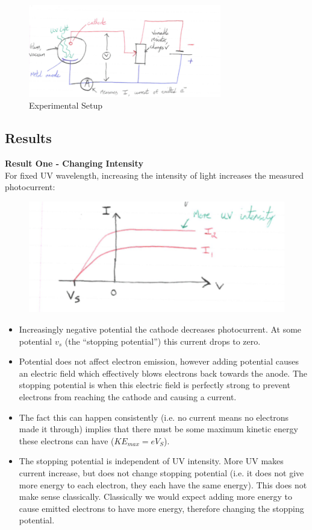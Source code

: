 \begin{figure}[H]
    \centering
    \includegraphics[width=0.75\textwidth]{figures/lec03-02.png}
     \caption{Experimental Setup}
\end{figure}

\subsection*{Results}
\textbf{Result One - Changing Intensity}\\
For fixed UV wavelength, increasing the intensity of light increases the measured photocurrent:
\begin{figure}[H]
    \centering
    \includegraphics{figures/lec03-03.png}
    \caption{}
\end{figure}
\begin{itemize}
    \item Increasingly negative potential the cathode decreases photocurrent. At some potential $v_s$ (the ``stopping potential'') this current drops to zero.
    \item Potential does not affect electron emission, however adding potential causes an electric field which effectively blows electrons back towards the anode. The stopping potential is when this electric field is perfectly strong to prevent electrons from reaching the cathode and causing a current.
    \item The fact this can happen consistently (i.e. no current means no electrons made it through) implies that there must be some maximum kinetic energy these electrons can have ($KE_{max} = eV_S$).
    \item The stopping potential is independent of UV intensity. More UV makes current increase, but does not change stopping potential (i.e. it does not give more energy to each electron, they each have the same energy). This does not make sense classically. Classically we would expect adding more energy to cause emitted electrons to have more energy, therefore changing the stopping potential.
\end{itemize}

